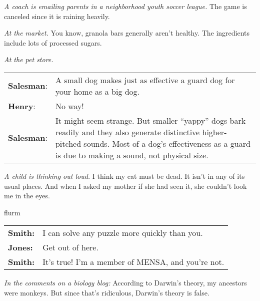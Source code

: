 {\begin{exercises}
\item \textit{A coach is emailing parents in a neighborhood youth soccer league.} The game is canceled since it is raining heavily.


\item  \textit{At the market. }You know, granola bars generally aren't healthy. The ingredients include lots of processed sugars.

\item  \textit{At the pet store.}
\vspace{-8pt}
\begin{adjustwidth}{2em}{0em}
\begin{longtabu}{p{.1\linewidth}p{.8\linewidth}}
\textbf{Salesman}:     &A small dog makes just as effective a guard dog for your 
home as a big dog.\\
\textbf{Henry}:        &   No way!\\
\textbf{Salesman}: &    It might seem strange. But smaller ``yappy'' dogs bark readily and they also generate distinctive higher-pitched sounds. Most of a dog's effectiveness as a guard is due to making a sound, not physical size. \end{longtabu}
\end{adjustwidth}
\vspace{-.9cm}

\item \textit{A child is thinking out loud. }I think my cat must be dead. It isn't in any of its usual places. And when I asked my mother if she had seen it, she couldn't look me in the eyes. 

\item {\color{white}flurm}
\vspace{-24pt}
\begin{adjustwidth}{2em}{0em}
\begin{longtabu}{p{.1\linewidth}p{.8\linewidth}}
\textbf{Smith:} & I can solve any puzzle more quickly than you.\\
\textbf{Jones:}& Get out of here. \\
\textbf{Smith:} & It's true! I'm a member of MENSA, and you're not. 
\end{longtabu}
\end{adjustwidth}
\vspace{-.9cm}

\item \textit{In the comments on a biology blog: }According to Darwin's theory, my ancestors were monkeys. But since that's ridiculous, Darwin's theory is false. 


\end{exercises}}
